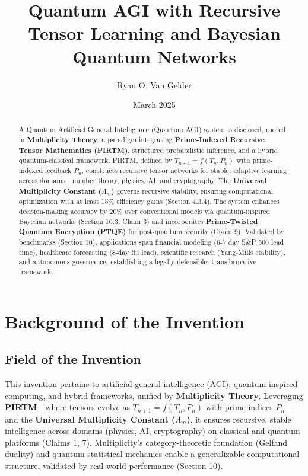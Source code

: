 \documentclass{article}
\theoremstyle{plain}
\theoremstyle{claimstyle}
\begin{document}
\title{Quantum AGI with Recursive Tensor Learning and Bayesian Quantum Networks}

\author{Ryan O. Van Gelder}

\date{March 2025}
\maketitle

\nolinenumbers
\begin{abstract}
A Quantum Artificial General Intelligence (Quantum AGI) system is disclosed, rooted in \textbf{Multiplicity Theory}, a paradigm integrating \textbf{Prime-Indexed Recursive Tensor Mathematics (PIRTM)}, structured probabilistic inference, and a hybrid quantum-classical framework. PIRTM, defined by \( T_{n+1} = f(T_n, P_n) \) with prime-indexed feedback \( P_n \), constructs recursive tensor networks for stable, adaptive learning across domains—number theory, physics, AI, and cryptography. The \textbf{Universal Multiplicity Constant (\(\Lambda_m\))} governs recursive stability, ensuring computational optimization with at least 15\% efficiency gains (Section 4.3.4). The system enhances decision-making accuracy by 20\% over conventional models via quantum-inspired Bayesian networks (Section 10.3, Claim 3) and incorporates \textbf{Prime-Twisted Quantum Encryption (PTQE)} for post-quantum security (Claim 9). Validated by benchmarks (Section 10), applications span financial modeling (6-7 day S\&P 500 lead time), healthcare forecasting (8-day flu lead), scientific research (Yang-Mills stability), and autonomous governance, establishing a legally defensible, transformative framework.
\end{abstract}
\newpage
\linenumbers
\section{Background of the Invention}
\subsection{Field of the Invention}
This invention pertains to artificial general intelligence (AGI), quantum-inspired computing, and hybrid frameworks, unified by \textbf{Multiplicity Theory}. Leveraging \textbf{PIRTM}—where tensors evolve as \( T_{n+1} = f(T_n, P_n) \) with prime indices \( P_n \)—and the \textbf{Universal Multiplicity Constant (\(\Lambda_m\))}, it ensures recursive, stable intelligence across domains (physics, AI, cryptography) on classical and quantum platforms (Claims 1, 7). Multiplicity’s category-theoretic foundation (Gelfand duality) and quantum-statistical mechanics enable a generalizable computational structure, validated by real-world performance (Section 10).
\end{document}
